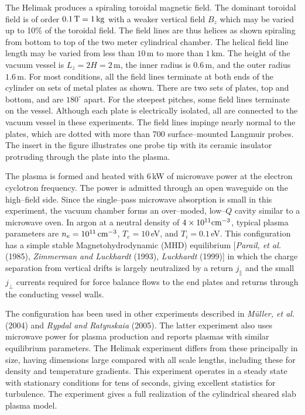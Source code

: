 \documentclass[a4paper,openany,12pt]{report}
\begin{document}
The Helimak produces a spiraling toroidal magnetic field. The dominant toroidal field is of order $0.1\,\rm T=1\,kg$ with a weaker vertical field $B_z$ which may be varied up to 10\% of the toroidal field. The field lines are thus helices as shown spiraling from bottom to top of the two meter cylindrical chamber. The helical field line length may be varied from less than $10\,$m to more than $1\,$km. The height of the vacuum vessel is $L_z = 2H = 2\,$m, the inner radius is $0.6\,$m, and the outer radius $1.6\,$m. For most conditions, all the field lines terminate at both ends of the cylinder on sets of metal plates as shown. There are two sets of plates, top and bottom, and are $180^\circ$ apart. For the steepest pitches, some field lines terminate on the vessel. Although each plate is electrically isolated, all are connected to the vacuum vessel in these experiments. The field lines impinge nearly normal to the plates, which are dotted with more than 700 surface--mounted Langmuir probes. The insert in the figure illustrates one probe tip with its ceramic insulator protruding through the plate into the plasma. 

The plasma is formed and heated with $6\,$kW of microwave power at the electron cyclotron frequency. The power is admitted through an open waveguide on the high--field side. Since the single--pass microwave absorption is small in this experiment, the vacuum chamber forms an over--moded, low--$Q$ cavity similar to a microwave oven. In argon at a neutral density of $4\times 10^{11}\rm cm^{-3}$, typical plasma parameters are $n_e = 10^{11}\,\rm cm^{-3}$, $T_e = 10\,$eV, and $T_i = 0.1\,$eV. This configuration has a simple stable Magnetohydrodynamic (MHD) equilibrium [\emph{Parail, et al.} (1985), \emph{Zimmerman and Luckhardt} (1993), \emph{Luckhardt} (1999)] in which the charge separation from vertical drifts is largely neutralized by a return $j_\|$ and the small $j_\perp$ currents required for force balance flows to the end plates and returns through the conducting vessel walls. 

The configuration has been used in other experiments described in \emph{M\"uller, et al.} (2004) and \emph{Rypdal and Ratynskaia} (2005). The latter experiment also uses microwave power for plasma production and reports plasmas with similar equilibrium parameters. The Helimak experiment differs from these principally in size, having dimensions large compared with all scale lengths, including these for density and temperature gradients. This experiment operates in a steady state with stationary conditions for tens of seconds, giving excellent statistics for turbulence. The experiment gives a full realization of the cylindrical sheared slab plasma model. 
\end{document}
